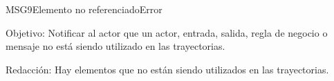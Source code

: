\begin{mensaje}{MSG9}{Elemento no referenciado}{Error}
	\item [Objetivo:] Notificar al actor que un actor, entrada, salida, regla de negocio o mensaje no está siendo utilizado en las trayectorias.
	\item[Redacción:] Hay elementos que no están siendo utilizados en las trayectorias.
\end{mensaje}